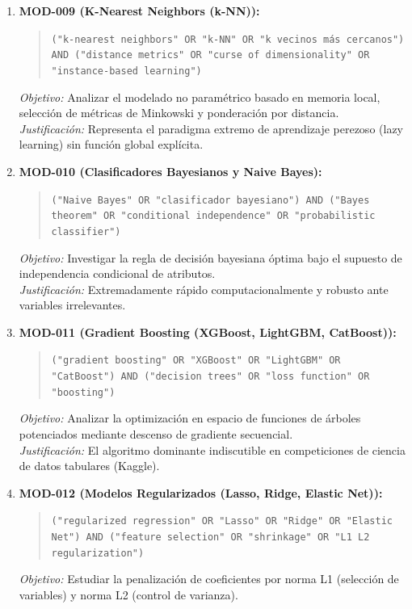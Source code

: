 \begin{enumerate}
  \textit{Justificación:} Excelente capacidad de generalización en espacios de alta dimensionalidad (datos genómicos, imágenes).
  \item \textbf{MOD-009 (K-Nearest Neighbors (k-NN)):}
  \begin{quote}
  \texttt{("k-nearest neighbors" OR "k-NN" OR "k vecinos más cercanos") AND ("distance metrics" OR "curse of dimensionality" OR "instance-based learning")}
  \end{quote}
  \textit{Objetivo:} Analizar el modelado no paramétrico basado en memoria local, selección de métricas de Minkowski y ponderación por distancia.\\
  \textit{Justificación:} Representa el paradigma extremo de aprendizaje perezoso (lazy learning) sin función global explícita.
  \item \textbf{MOD-010 (Clasificadores Bayesianos y Naive Bayes):}
  \begin{quote}
  \texttt{("Naive Bayes" OR "clasificador bayesiano") AND ("Bayes theorem" OR "conditional independence" OR "probabilistic classifier")}
  \end{quote}
  \textit{Objetivo:} Investigar la regla de decisión bayesiana óptima bajo el supuesto de independencia condicional de atributos.\\
  \textit{Justificación:} Extremadamente rápido computacionalmente y robusto ante variables irrelevantes.
  \item \textbf{MOD-011 (Gradient Boosting (XGBoost, LightGBM, CatBoost)):}
  \begin{quote}
  \texttt{("gradient boosting" OR "XGBoost" OR "LightGBM" OR "CatBoost") AND ("decision trees" OR "loss function" OR "boosting")}
  \end{quote}
  \textit{Objetivo:} Analizar la optimización en espacio de funciones de árboles potenciados mediante descenso de gradiente secuencial.\\
  \textit{Justificación:} El algoritmo dominante indiscutible en competiciones de ciencia de datos tabulares (Kaggle).
  \item \textbf{MOD-012 (Modelos Regularizados (Lasso, Ridge, Elastic Net)):}
  \begin{quote}
  \texttt{("regularized regression" OR "Lasso" OR "Ridge" OR "Elastic Net") AND ("feature selection" OR "shrinkage" OR "L1 L2 regularization")}
  \end{quote}
  \textit{Objetivo:} Estudiar la penalización de coeficientes por norma L1 (selección de variables) y norma L2 (control de varianza).\\

\end{enumerate}
